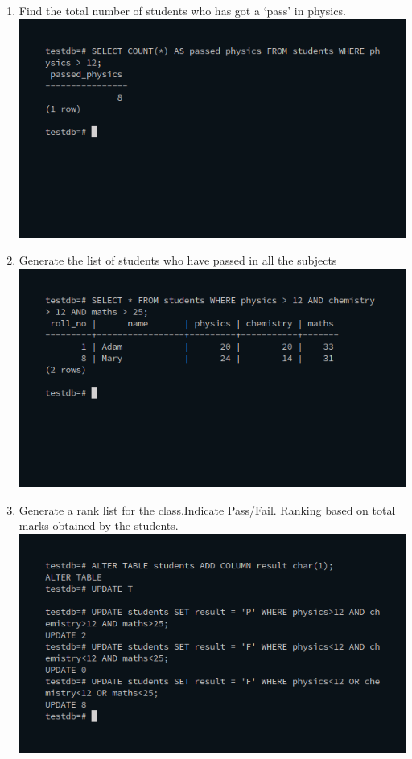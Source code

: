 \documentclass[10pt,a4paper,titlepage]{report}
\begin{document}
{\begin{enumerate}
	\item Find the total number of students who has got a ‘pass’ in physics.\newline
		\includegraphics[width=\linewidth]{../Images/Aggregate/4.png}\newline
	\item Generate the list of students who have passed in all the subjects\newline
		\includegraphics[width=\linewidth]{../Images/Aggregate/5.png}\newline
	\item Generate a rank list for the class.Indicate Pass/Fail. Ranking based on total marks obtained by the
			students.\newline
		\includegraphics[width=\linewidth]{../Images/Aggregate/6.png}\newline

\end{enumerate}}
\end{document}
